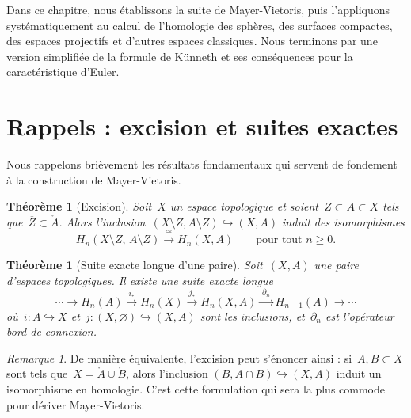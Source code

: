\documentclass[12pt,a4paper,openany]{book}
\theoremstyle{definition}
\theoremstyle{plain}
\newtheorem{theoreme}[definition]{Théorème}
\theoremstyle{remark}
\newtheorem{remarque}[definition]{Remarque}
\begin{document}
Dans ce chapitre, nous établissons la suite de Mayer-Vietoris, puis l'appliquons
systématiquement au calcul de l'homologie des sphères, des surfaces compactes, des
espaces projectifs et d'autres espaces classiques. Nous terminons par une version
simplifiée de la formule de Künneth et ses conséquences pour la caractéristique d'Euler.

\section{Rappels : excision et suites exactes}\label{sec:mv-rappels}

Nous rappelons brièvement les résultats fondamentaux qui servent de fondement à la
construction de Mayer-Vietoris.

\begin{theoreme}[Excision]\label{thm:excision-rappel}
Soit~$X$ un espace topologique et soient~$Z \subset A \subset X$ tels
que~$\overline{Z} \subset \mathring{A}$. Alors l'inclusion~$(X \setminus Z, A \setminus Z)
\hookrightarrow (X, A)$ induit des isomorphismes
\[
  H_n(X \setminus Z,\, A \setminus Z) \xrightarrow{\;\cong\;} H_n(X, A)
  \qquad \text{pour tout } n \geqslant 0.
\]
\end{theoreme}

\begin{theoreme}[Suite exacte longue d'une paire]\label{thm:sel-paire-rappel}
Soit~$(X, A)$ une paire d'espaces topologiques. Il existe une suite exacte longue
\[
  \cdots \longrightarrow H_n(A) \xrightarrow{\;i_*\;} H_n(X)
  \xrightarrow{\;j_*\;} H_n(X, A) \xrightarrow{\;\partial_n\;}
  H_{n-1}(A) \longrightarrow \cdots
\]
où~$i \colon A \hookrightarrow X$ et~$j \colon (X, \varnothing) \hookrightarrow (X, A)$
sont les inclusions, et~$\partial_n$ est l'opérateur bord de connexion.
\end{theoreme}

\begin{remarque}\label{rem:excision-variante}
De manière équivalente, l'excision peut s'énoncer ainsi : si~$A, B \subset X$ sont
tels que~$X = \mathring{A} \cup \mathring{B}$, alors l'inclusion
$(B, A \cap B) \hookrightarrow (X, A)$ induit un isomorphisme en homologie.
C'est cette formulation qui sera la plus commode pour dériver Mayer-Vietoris.
\end{remarque}
\end{document}
